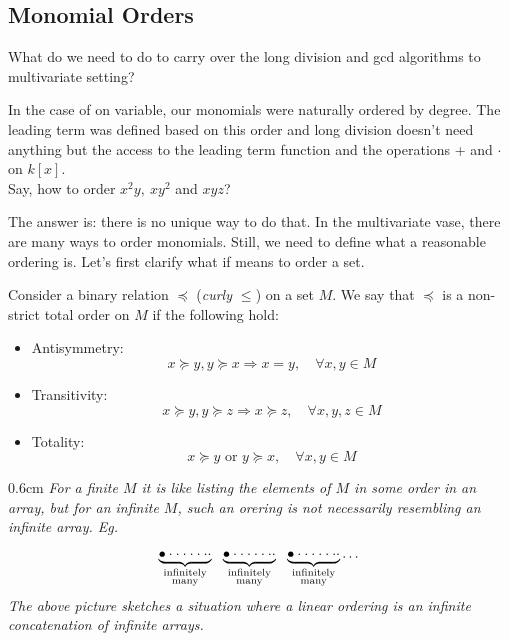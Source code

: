 \subsection{Monomial Orders}  
What do we need to do to carry over the long division and gcd algorithms to multivariate setting? 

In the case of on variable, our monomials were naturally ordered by degree. The leading term was defined based on this order and long division doesn't need anything but 
the access to the leading term function and the operations + and $\cdot$ on $k[x]$. \\[0.3em]
Say, how to order $x^2y, \ xy^2$ and $xyz$? 

The answer is: there is no unique way to do that. In the multivariate vase, there are many ways to order monomials. Still, we need to define what a reasonable ordering is. 
Let's first clarify what if means to order a set.  

\begin{definition}[title = Definition 2.1.1]
  Consider a binary relation $\preccurlyeq$ (\textit{\textcolor{airforceblue}{curly $\leq$}}) on a set $M$. We say that $\preccurlyeq$ is a non-strict total order on $M$ if the following hold:
  \begin{itemize}
    \item Antisymmetry: \[x \succcurlyeq y, y \succcurlyeq x \Rightarrow x = y, \quad \forall x,y \in M\] 
    \item Transitivity: \[x \succcurlyeq y, y \succcurlyeq z \Rightarrow x \succcurlyeq z, \quad \forall x,y,z \in M\]
    \item Totality: \[x \succcurlyeq y \text{ or } y \succcurlyeq x, \quad \forall x,y \in M\]
  \end{itemize} 
\end{definition}  

\begin{center}
  \begin{addmargin}[0.6cm]{0.6cm}
      \textit{\textcolor{airforceblue}{For a finite $M$ it is like listing the elements of $M$ in some order in an array, but for an infinite $M$, such an orering is not 
      necessarily resembling an infinite array. Eg.}}
    \[\underbrace{\bullet \cdot \cdot \cdot \cdot \cdot \cdot \cdot}_{\mathclap{\substack{\text{infinitely} \\ \text{many}}}} \ \ \underbrace{\bullet \cdot \cdot \cdot \cdot \cdot \cdot \cdot}_{\mathclap{\substack{\text{infinitely} \\ \text{many}}}}\ \ \underbrace{\bullet \cdot \cdot \cdot \cdot \cdot \cdot \cdot}_{\mathclap{\substack{\text{infinitely} \\ \text{many}}}} \dots\]
     \textit{\textcolor{airforceblue}{The above picture sketches a situation where a linear ordering is an infinite concatenation of infinite arrays.}}
  \end{addmargin}
\end{center}

